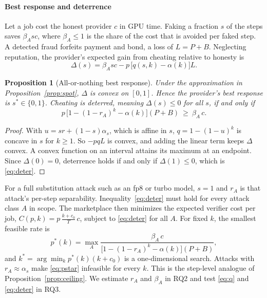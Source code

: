 \documentclass[preprint,review,12pt,authoryear]{elsarticle}
\newtheorem{proposition}{Proposition}
\theoremstyle{definition}
\begin{document}
\paragraph{Best response and deterrence}
Let a job cost the honest provider $c$ in GPU time. Faking a fraction $s$ of the steps saves $\beta_A s c$, where $\beta_A\le1$ is the share of the cost that is avoided per faked step. A detected fraud forfeits payment and bond, a loss of $L=P+B$. Neglecting reputation, the provider's expected gain from cheating relative to honesty is
\begin{equation}
\Delta(s)=\beta_A s c-p\,\bigl[q(s,k)-\alpha(k)\bigr]L. \label{eq:gain}
\end{equation}
\begin{proposition}[All-or-nothing best response]\label{prop:allornothing}
Under the approximation in Proposition~\ref{prop:spot}, $\Delta$ is convex on $[0,1]$. Hence the provider's best response is $s^\ast\in\{0,1\}$. Cheating is deterred, meaning $\Delta(s)\le0$ for all $s$, if and only if
\begin{equation}
p\,\bigl[1-(1-r_A)^k-\alpha(k)\bigr](P+B)\ \ge\ \beta_A\,c. \label{eq:deter}
\end{equation}
\end{proposition}
\begin{proof}
With $u=sr+(1-s)\alpha_s$, which is affine in $s$, $q=1-(1-u)^k$ is concave in $s$ for $k\ge1$. So $-pqL$ is convex, and adding the linear term keeps $\Delta$ convex. A convex function on an interval attains its maximum at an endpoint. Since $\Delta(0)=0$, deterrence holds if and only if $\Delta(1)\le0$, which is \eqref{eq:deter}.
\end{proof}
For a full substitution attack such as an fp8 or turbo model, $s=1$ and $r_A$ is that attack's per-step separability. Inequality~\eqref{eq:deter} must hold for every attack class $A$ in scope. The marketplace then minimizes the expected verifier cost per job, $C(p,k)=p\,\frac{k+c_0}{T}\,c$, subject to \eqref{eq:deter} for all $A$. For fixed $k$, the smallest feasible rate is
\begin{equation}
p^\ast(k)=\max_A\frac{\beta_A\,c}{\bigl[1-(1-r_A)^k-\alpha(k)\bigr](P+B)}, \label{eq:pstar}
\end{equation}
and $k^\ast=\arg\min_k p^\ast(k)(k+c_0)$ is a one-dimensional search. Attacks with $r_A\approx\alpha_s$ make \eqref{eq:pstar} infeasible for every $k$. This is the step-level analogue of Proposition~\ref{prop:ceiling}. We estimate $r_A$ and $\beta_A$ in RQ2 and test \eqref{eq:q} and \eqref{eq:deter} in RQ3.
\end{document}
